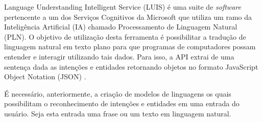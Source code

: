 Language Understanding Intelligent Service (LUIS) é uma suite de \textit{software} pertencente a um dos Serviços Cognitivos da Microsoft que utiliza um ramo da Inteligência Artificial (IA) chamado Processamento de Linguagem Natural (PLN). O objetivo de utilização desta ferramenta é possibilitar a tradução de linguagem natural em texto plano para que programas de computadores possam entender e interagir utilizando tais dados. Para isso, a API extrai de uma sentença dada as intenções e entidades retornando objetos no formato JavaScript Object Notation (JSON) \cite{Mayo:2017}.

É necessário, anteriormente, a criação de modelos de linguagens os quais possibilitam o reconhecimento de intenções e entidades em uma entrada do usuário. Seja esta entrada uma frase ou um texto em linguagem natural.
